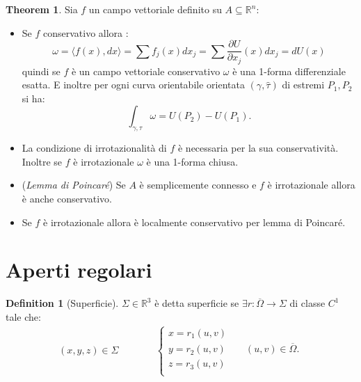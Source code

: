 \documentclass[leqno]{article}
\theoremstyle{definition}
\newtheorem{definition}{Definition}[section]
\numberwithin{equation}{section}
\newtheorem{theorem}{Theorem}[section]
\theoremstyle{remark}
\begin{document}
	\begin{theorem}
		Sia $f$ un campo vettoriale definito su $A\subseteq\mathbb{R}^n$:
		\begin{itemize}
			\item Se $f$ conservativo allora :      \begin{equation}
				\omega=\langle f(x),dx\rangle= \sum f_j(x)dx_j=\sum \dfrac{\partial U}{\partial x_j}(x)dx_j=dU(x)
			\end{equation}
			quindi se $f$ è un campo vettoriale conservativo $\omega$ è una 1-forma differenziale esatta. E inoltre per ogni curva orientabile orientata $(\gamma,\hat{\tau})$ di estremi $P_1,P_2$ si ha: 
			\begin{equation}
				\int_{\gamma,\tau}\omega = U(P_2)-U(P_1).
			\end{equation}
			\item La condizione di irrotazionalità di $f$ è necessaria per la sua conservatività. Inoltre se $f$ è irrotazionale $\omega$ è una 1-forma chiusa. 
			\item (\textit{Lemma di Poincaré}) Se $A$ è semplicemente connesso e $f$ è irrotazionale allora è anche conservativo.
			\item Se $f$ è irrotazionale allora è localmente conservativo per lemma di Poincaré.
		\end{itemize}
		
	\end{theorem}
	\section{Aperti regolari}
	
	\begin{definition}[Superficie]
		$\Sigma\in\mathbb{R}^3$ è detta superficie se $\exists r :\overline{\Omega} \to \Sigma$ di classe $C^1$ tale che:
		\begin{equation}
			\begin{split}
				(x,y,z)\in \Sigma \quad \quad \quad 
			\end{split}
			\begin{split}
				\begin{cases}
					x=r_1(u,v)\\
					y=r_2(u,v) \quad \quad  (u,v)\in \overline{\Omega}.\\
					z=r_3(u,v)\\
				\end{cases}
			\end{split}    
		\end{equation}
	\end{definition}
	
\end{document}

